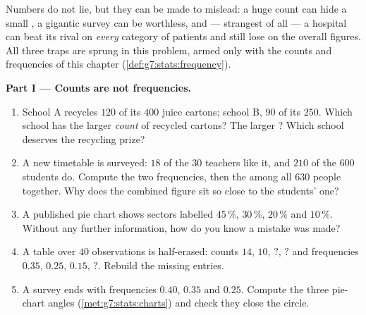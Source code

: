 \begin{problem}
\label{pb:g7:stats:1}
Numbers do not lie, but they can be made to mislead: a huge count
can hide a small , a gigantic survey can be worthless,
and --- strangest of all --- a hospital can beat its rival on
\emph{every} category of patients and still lose on the overall
figures. All three traps are sprung in this problem, armed only
with the counts and frequencies of this chapter
(\cref{def:g7:stats:frequency}).

\medskip
\noindent\textbf{Part I --- Counts are not frequencies.}
\begin{enumerate}
  \item School A recycles $120$ of its $400$ juice cartons;
        school B, $90$ of its $250$. Which school has the larger
        \emph{count} of recycled cartons? The larger
        \emph{}? Which school deserves the recycling
        prize?
  \item A new timetable is surveyed: $18$ of the $30$ teachers
        like it, and $210$ of the $600$ students do. Compute the
        two frequencies, then the  among all $630$
        people together. Why does the combined figure sit so
        close to the students' one?
  \item A published pie chart shows sectors labelled $45\,\%$,
        $30\,\%$, $20\,\%$ and $10\,\%$. Without any further
        information, how do you know a mistake was made?
  \item A  table over $40$ observations is half-erased:
        counts $14$, $10$, $?$, $?$ and frequencies $0.35$,
        $0.25$, $0.15$, $?$. Rebuild the missing entries.
  \item A survey ends with frequencies $0.40$, $0.35$ and
        $0.25$. Compute the three pie-chart angles
        (\cref{met:g7:stats:charts}) and check they close the
        circle.
\end{enumerate}


\end{problem}
